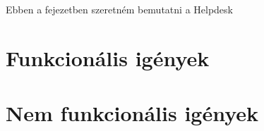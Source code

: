 Ebben a fejezetben szeretném bemutatni a \foreignlanguage{british}{Helpdesk}


\section{Funkcionális igények}



\section{Nem funkcionális igények}	